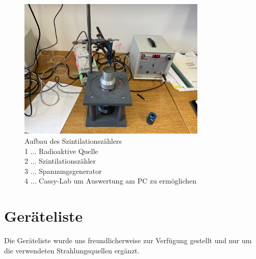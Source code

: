 \documentclass[12pt,english,ngerman]{scrartcl}
\begin{document}
\begin{figure}[H]
    \begin{center}
    \includegraphics[width=0.8\textwidth]{./figures/szinti.png}
      \end{center}
      \caption[Aufbau des Szintilationszählers]{Aufbau des Szintilationszählers \\ 
        1 $\dots$ Radioaktive Quelle \\ 
        2 $\dots$ Szintilationszähler \\
        3 $\dots$ Spannungsgenerator \\ 
        4 $\dots$ Cassy-Lab um Auswertung am PC zu ermöglichen}
      \label{fig:szinti}
      
  \end{figure}


\section{Geräteliste}

Die Geräteliste wurde uns freundlicherweise zur Verfügung gestellt und nur um die verwendeten Strahlungsquellen ergänzt. \cite[]{}
\end{document}
